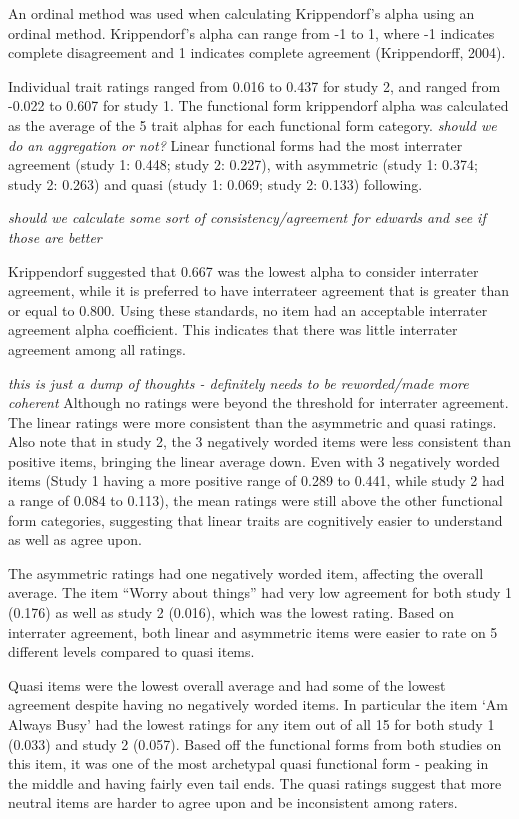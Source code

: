 \documentclass[
  ,jou]{apa6}
\begin{document}
An ordinal method was used when calculating Krippendorf's alpha using an ordinal method. Krippendorf's alpha can range from -1 to 1, where -1 indicates complete disagreement and 1 indicates complete agreement (Krippendorff, 2004).

Individual trait ratings ranged from 0.016 to 0.437 for study 2, and ranged from -0.022 to 0.607 for study 1. The functional form krippendorf alpha was calculated as the average of the 5 trait alphas for each functional form category. \emph{should we do an aggregation or not?} Linear functional forms had the most interrater agreement (study 1: 0.448; study 2: 0.227), with asymmetric (study 1: 0.374; study 2: 0.263) and quasi (study 1: 0.069; study 2: 0.133) following.

\emph{should we calculate some sort of consistency/agreement for edwards and see if those are better}

Krippendorf suggested that 0.667 was the lowest alpha to consider interrater agreement, while it is preferred to have interrateer agreement that is greater than or equal to 0.800. Using these standards, no item had an acceptable interrater agreement alpha coefficient. This indicates that there was little interrater agreement among all ratings.

\emph{this is just a dump of thoughts - definitely needs to be reworded/made more coherent}
Although no ratings were beyond the threshold for interrater agreement. The linear ratings were more consistent than the asymmetric and quasi ratings. Also note that in study 2, the 3 negatively worded items were less consistent than positive items, bringing the linear average down. Even with 3 negatively worded items (Study 1 having a more positive range of 0.289 to 0.441, while study 2 had a range of 0.084 to 0.113), the mean ratings were still above the other functional form categories, suggesting that linear traits are cognitively easier to understand as well as agree upon.

The asymmetric ratings had one negatively worded item, affecting the overall average. The item ``Worry about things'' had very low agreement for both study 1 (0.176) as well as study 2 (0.016), which was the lowest rating. Based on interrater agreement, both linear and asymmetric items were easier to rate on 5 different levels compared to quasi items.

Quasi items were the lowest overall average and had some of the lowest agreement despite having no negatively worded items. In particular the item `Am Always Busy' had the lowest ratings for any item out of all 15 for both study 1 (0.033) and study 2 (0.057). Based off the functional forms from both studies on this item, it was one of the most archetypal quasi functional form - peaking in the middle and having fairly even tail ends. The quasi ratings suggest that more neutral items are harder to agree upon and be inconsistent among raters.
\end{document}
